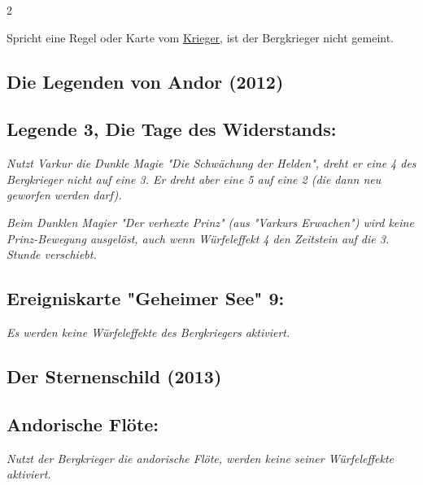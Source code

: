 \documentclass[10pt, a4paper, oneside]{book}
\newcommand{\fan}[1]{\textit{#1}}
\begin{document}
\begin{multicols*}{2}
\begin{nobgcolor}
Spricht eine Regel oder Karte vom \hyperref[Krieger]{Krieger}, ist der Bergkrieger nicht gemeint.

\end{nobgcolor}






\begin{bgcolor}

\section{Die Legenden von Andor (2012)}



\subsection{Legende 3, Die Tage des Widerstands:}

\fan{Nutzt Varkur die Dunkle Magie "Die Schwächung der Helden", dreht er eine 4 des Bergkrieger nicht auf eine 3. Er dreht aber eine 5 auf eine 2 (die dann neu geworfen werden darf).}

\fan{Beim Dunklen Magier "Der verhexte Prinz" (aus "Varkurs Erwachen") wird keine Prinz-Bewegung ausgelöst, auch wenn Würfeleffekt 4 den Zeitstein auf die 3. Stunde verschiebt.}







\subsection{Ereigniskarte "Geheimer See" 9:}

\fan{Es werden keine Würfeleffekte des Bergkriegers aktiviert.}

\end{bgcolor}



\begin{bgcolor}
\section{Der Sternenschild (2013)}

\subsection{Andorische Flöte:}

\fan{Nutzt der Bergkrieger die andorische Flöte, werden keine seiner Würfeleffekte aktiviert.}




\end{bgcolor}
\end{multicols*}
\end{document}
